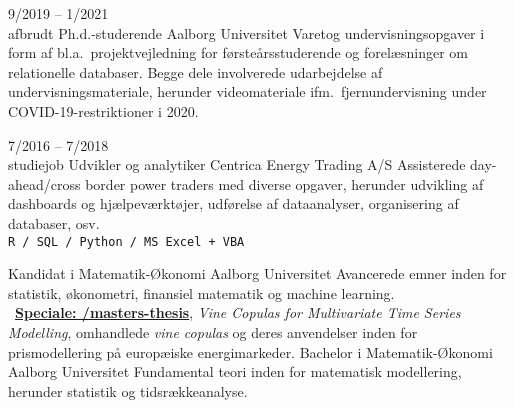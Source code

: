 \documentclass[9pt]{template/developercv}
\newcommand{\link}[2]{\faLink~\href{#1}{\textbf{#2}}}
\begin{document}
\begin{entrylist}
  \entry
  {9/2019 -- 1/2021\\{\footnotesize afbrudt}}
  {Ph.d.-studerende}
  {Aalborg Universitet}
  {
    Varetog undervisningsopgaver i form af bl.a.\ projektvejledning for førsteårsstuderende og forelæsninger om relationelle databaser.
    Begge dele involverede udarbejdelse af undervisningsmateriale, herunder videomateriale ifm.\ fjernundervisning under COVID-19-restriktioner i 2020.
  }

  \entry
  {7/2016 -- 7/2018\\{\footnotesize studiejob}}
  {Udvikler og analytiker}
  {Centrica Energy Trading A/S}
  {
    Assisterede day-ahead/cross border power traders med diverse opgaver, herunder udvikling af dashboards og hjælpeværktøjer, udførelse af dataanalyser, organisering af databaser, osv.
    \\
    \texttt{R / SQL / Python / MS Excel + VBA}
  }
\end{entrylist}

\begin{entrylist}
   {Kandidat i Matematik-Økonomi} {Aalborg Universitet} {
    Avancerede emner inden for statistik, økonometri, finansiel matematik og machine learning.\\
    \link{https://github.com/janusvm/masters-thesis}{Speciale: \faGithub/masters-thesis},
    \emph{Vine Copulas for Multivariate Time Series Modelling}, omhandlede \emph{vine copulas} og deres anvendelser inden for prismodellering på europæiske energimarkeder.
  }
   {Bachelor i Matematik-Økonomi} {Aalborg Universitet} {
    Fundamental teori inden for matematisk modellering, herunder statistik og tidsrækkeanalyse.
  }
\end{entrylist}
\end{document}
